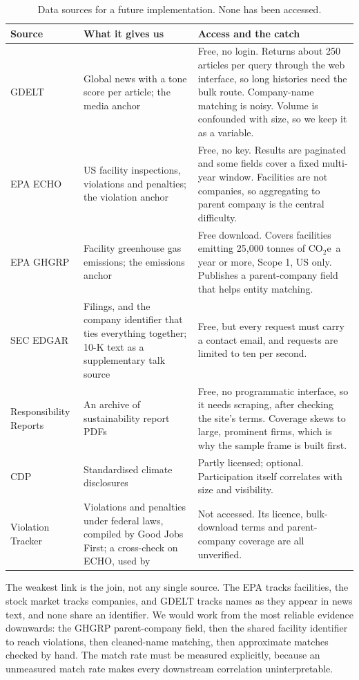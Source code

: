 \documentclass[12pt,a4paper]{article}
\newcommand{\co}{CO$_2$e}
\begin{document}
\begin{table}[!htbp]
\centering
\caption{Data sources for a future implementation. None has been accessed.}
\label{tab:data}
\small
\begin{tabularx}{\textwidth}{@{}L{2.5cm}L{4.0cm}X@{}}
\toprule
\textbf{Source} & \textbf{What it gives us} & \textbf{Access and the catch}\\
\midrule
GDELT & Global news with a tone score per article; the media anchor & Free, no login. Returns about 250 articles per query through the web interface, so long histories need the bulk route. Company-name matching is noisy. Volume is confounded with size, so we keep it as a variable.\\
EPA ECHO & US facility inspections, violations and penalties; the violation anchor & Free, no key. Results are paginated and some fields cover a fixed multi-year window. Facilities are not companies, so aggregating to parent company is the central difficulty.\\
EPA GHGRP & Facility greenhouse gas emissions; the emissions anchor & Free download. Covers facilities emitting 25,000 tonnes of \co\ a year or more, Scope 1, US only. Publishes a parent-company field that helps entity matching.\\
SEC EDGAR & Filings, and the company identifier that ties everything together; 10-K text as a supplementary talk source & Free, but every request must carry a contact email, and requests are limited to ten per second.\\
Responsibility Reports & An archive of sustainability report PDFs & Free, no programmatic interface, so it needs scraping, after checking the site's terms. Coverage skews to large, prominent firms, which is why the sample frame is built first.\\
CDP & Standardised climate disclosures & Partly licensed; optional. Participation itself correlates with size and visibility.\\
Violation Tracker & Violations and penalties under federal laws, compiled by Good Jobs First; a cross-check on ECHO, used by \citet{raghunandan2022} & Not accessed. Its licence, bulk-download terms and parent-company coverage are all unverified.\\
\bottomrule
\end{tabularx}
\end{table}

The weakest link is the join, not any single source. The EPA tracks facilities, the stock market
tracks companies, and GDELT tracks names as they appear in news text, and none share an identifier.
We would work from the most reliable evidence downwards: the GHGRP parent-company field, then the
shared facility identifier to reach violations, then cleaned-name matching, then approximate
matches checked by hand. The match rate must be measured explicitly, because an unmeasured match
rate makes every downstream correlation uninterpretable.
\end{document}
